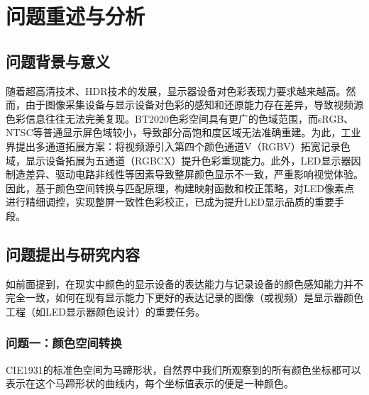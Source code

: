 \chapter[\hspace{0pt}问题重述与分析]{{\heiti{}\hspace{0pt}问题重述与分析}}\label{chapter1: 问题重述与分析}

\removelofgap
\removelotgap

\section[\hspace{-2pt}问题背景与意义]{{\heiti{} \hspace{-8pt}问题背景与意义}}\label{section1: 问题背景与意义}

随着超高清技术、HDR技术的发展，显示器设备对色彩表现力要求越来越高。然而，由于图像采集设备与显示设备对色彩的感知和还原能力存在差异，导致视频源色彩信息往往无法完美复现。BT2020色彩空间具有更广的色域范围，而sRGB、NTSC等普通显示屏色域较小，导致部分高饱和度区域无法准确重建。为此，工业界提出多通道拓展方案：将视频源引入第四个颜色通道V（RGBV）拓宽记录色域，显示设备拓展为五通道（RGBCX）提升色彩重现能力。此外，LED显示器因制造差异、驱动电路非线性等因素导致整屏颜色显示不一致，严重影响视觉体验。因此，基于颜色空间转换与匹配原理，构建映射函数和校正策略，对LED像素点进行精细调控，实现整屏一致性色彩校正，已成为提升LED显示品质的重要手段。

\section[\hspace{-2pt}问题提出与研究内容]{{\heiti{} \hspace{-8pt}问题提出与研究内容}}\label{section1: 问题提出与研究内容}

如前面提到，在现实中颜色的显示设备的表达能力与记录设备的颜色感知能力并不完全一致，如何在现有显示能力下更好的表达记录的图像（或视频）是显示器颜色工程（如LED显示器颜色设计）的重要任务。

\subsection[\hspace{-2pt}问题一：颜色空间转换]{{\heiti{} \hspace{-8pt}问题一：颜色空间转换}}\label{subsection1: 问题一}

CIE1931的标准色空间为马蹄形状，自然界中我们所观察到的所有颜色坐标都可以表示在这个马蹄形状的曲线内，每个坐标值表示的便是一种颜色。

